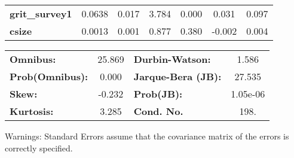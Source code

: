 \documentclass{report}
\begin{document}
\begin{center}
\begin{tabular}{lcccccc}
\textbf{grit\_survey1}   &       0.0638  &        0.017     &     3.784  &         0.000        &        0.031    &        0.097     \\
\textbf{csize}           &       0.0013  &        0.001     &     0.877  &         0.380        &       -0.002    &        0.004     \\
\bottomrule
\end{tabular}
\begin{tabular}{lclc}
\textbf{Omnibus:}       & 25.869 & \textbf{  Durbin-Watson:     } &    1.586  \\
\textbf{Prob(Omnibus):} &  0.000 & \textbf{  Jarque-Bera (JB):  } &   27.535  \\
\textbf{Skew:}          & -0.232 & \textbf{  Prob(JB):          } & 1.05e-06  \\
\textbf{Kurtosis:}      &  3.285 & \textbf{  Cond. No.          } &     198.  \\
\bottomrule
\end{tabular}
\end{center}

Warnings: \newline
 [1] Standard Errors assume that the covariance matrix of the errors is correctly specified.
\end{document}
